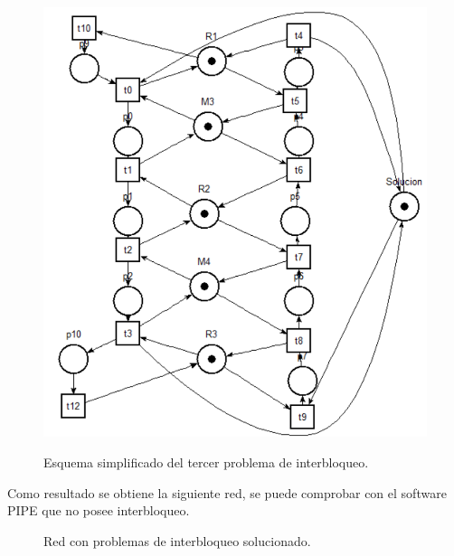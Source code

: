 \documentclass[10pt, a4paper,notitlepage]{article}
\begin{document}
\begin{figure}[H] %
	{\includegraphics[width=0.4\linewidth]{./figure/I31}}
	\caption{Esquema simplificado del tercer problema de interbloqueo.}
	\label{fig:I30}
\end{figure}

Como resultado se obtiene la siguiente red, se puede comprobar con el software PIPE que no posee interbloqueo.

\begin{figure}[H] %
	\caption{Red con problemas de interbloqueo solucionado.}
	\label{fig:red}
\end{figure}
\end{document}
